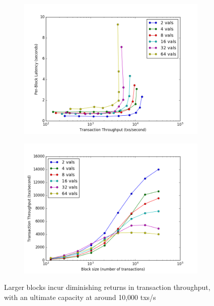 \begin{figure}[]
	\centering
	\begin{subfigure}{0.8 \textwidth}
		\includegraphics[width=\linewidth,height=\textheight,keepaspectratio]{figures/throughput/latency-throughput.png}
	\end{subfigure}

	\begin{subfigure}{0.8 \textwidth}
		\includegraphics[width=\linewidth,height=\textheight,keepaspectratio]{figures/throughput/throughput-blocksize.png}
	\end{subfigure}
	\centering
	\caption[Latency-Throughput tradeoff in non-faulty global network]{Larger blocks incur diminishing 
returns in transaction throughput, with an ultimate capacity at around 10,000 txs/s}
	\label{fig:exp:throughput}
\end{figure}

